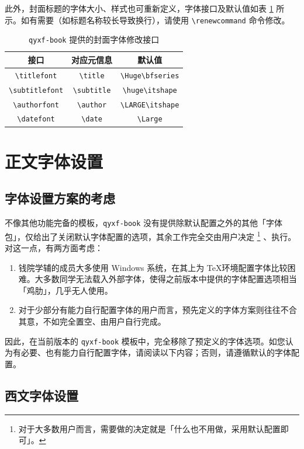 \documentclass[
  xits = false,
  10pt,
  twoside,
  openany,
  b5paper, %
  colorscheme = basic %
]{qyxf-book}
\renewcommand{\titlefont}{\Huge\bfseries}
\renewcommand{\subtitlefont}{\LARGE\itshape}
\begin{document}
此外，封面标题的字体大小、样式也可重新定义，字体接口及默认值如表 \ref{tab:preface-font} 所示。如有需要（如标题名称较长导致换行），请使用 \verb|\renewcommand| 命令修改。

\begin{table}[htbp]
  \centering
  \caption{\texttt{qyxf-book} 提供的封面字体修改接口}
  \label{tab:preface-font}
  \begin{tabular}{ccc}
    \toprule
    接口                    & 对应元信息              & 默认值                  \\
    \midrule
    \verb|\titlefont| & \verb|\title| & \verb|\Huge\bfseries| \\
    \verb|\subtitlefont| & \verb|\subtitle| & \verb|\huge\itshape| \\
    \verb|\authorfont| & \verb|\author| & \verb|\LARGE\itshape| \\
    \verb|\datefont| & \verb|\date| & \verb|\Large| \\
    \bottomrule
  \end{tabular}
\end{table}

\section{正文字体设置}

\subsection{字体设置方案的考虑}

不像其他功能完备的模板，\verb|qyxf-book| 没有提供除默认配置之外的其他「字体包」，仅给出了关闭默认字体配置的选项，其余工作完全交由用户决定
\footnote{对于大多数用户而言，需要做的决定就是「什么也不用做，采用默认配置即可」。}
、执行。对这一点，有两方面考虑：
\begin{enumerate}
  \item 钱院学辅的成员大多使用 Windows 系统，在其上为 \TeX 环境配置字体比较困难。大多数同学无法载入外部字体，使得之前版本中提供的字体配置选项相当「鸡肋」，几乎无人使用。
  \item 对于少部分有能力自行配置字体的用户而言，预先定义的字体方案则往往不合其意，不如完全置空、由用户自行完成。
\end{enumerate}
因此，在当前版本的 \verb|qyxf-book| 模板中，完全移除了预定义的字体选项。如您认为有必要、也有能力自行配置字体，请阅读以下内容；否则，请遵循默认的字体配置。

\subsection{西文字体设置}
\end{document}
